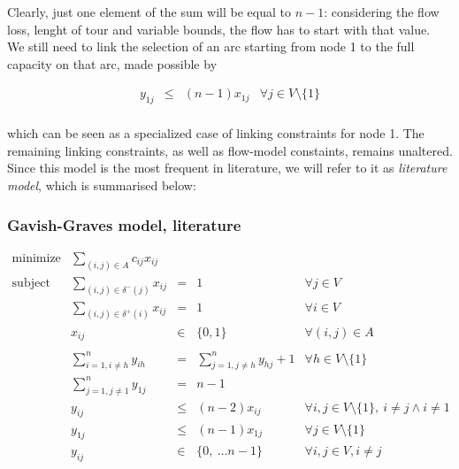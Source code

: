 \newpage
Clearly, just one element of the sum will be equal to $n - 1$: considering the
flow loss, lenght of tour and variable bounds, the flow has to start with that
value.\\ 
We still need to link the selection of an arc starting from node 1 to
the full capacity on that arc, made possible by 

\begin{equation*} 
    \begin{array}{rrlr} 
        y_{1j} & \leq & (n - 1) x_{1j} & \forall j \in V \setminus \{1\} \\
    \end{array} 
\end{equation*}

which can be seen as a specialized case of linking constraints for node 1. The
remaining linking constraints, as well as flow-model constaints, remains
unaltered.
Since this model is the most frequent in literature, we will refer to it as
\emph{literature model}, which is summarised below:

\subsubsection{Gavish-Graves model, literature}
\begin{equation*}
    \begin{array}{lrllr}
        \textrm{minimize}   & \displaystyle\sum_{(i, j) \in A} c_{ij}  x_{ij} \\
        \textrm{subject to} & \displaystyle\sum\limits_{(i, j) \in \delta^-(j)}  x_{ij} & = & 1 & \forall j \in V\\
                            & \displaystyle\sum\limits_{(i, j) \in \delta^+(i)}  x_{ij} & = & 1 & \forall i \in V\\
                            & x_{ij} & \in & \{0,1\} & \forall (i,j) \in A \\ \\
                            & \displaystyle\sum\limits_{i = 1, i \neq h}^n y_{ih} & = & \displaystyle\sum\limits_{j = 1, j \neq h}^n y_{hj} + 1 & \forall h \in V \setminus \{1\}\\
                            & \displaystyle\sum\limits_{j = 1, j \neq 1}^n y_{1j} & = & n - 1 & \\
                            & y_{ij} & \leq & (n - 2) x_{ij} & \forall i, j \in V \setminus \{1\},\ i \neq j \wedge i \neq 1 \\
                            & y_{1j} & \leq & (n - 1) x_{1j} & \forall j \in V \setminus \{1\} \\
                            & y_{ij} & \in & \{0,\ \dots n-1\} & \forall i,j \in V, i \neq j
    \end{array}
\end{equation*}

